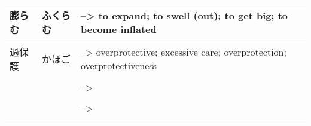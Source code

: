 \documentclass{article}
\begin{document}
\begin{tabular}{ l | l p{14cm}  }
膨らむ & ふくらむ &--> to expand; to swell (out); to get big; to become inflated \\ \hline\\[-1em]
過保護 & かほご &--> overprotective; excessive care; overprotection; overprotectiveness \\ \hline\\[-1em]
 & &--> \\ \hline\\[-1em]
 & &--> \\ \hline\\[-1em]
\end{tabular}


\end{document}
